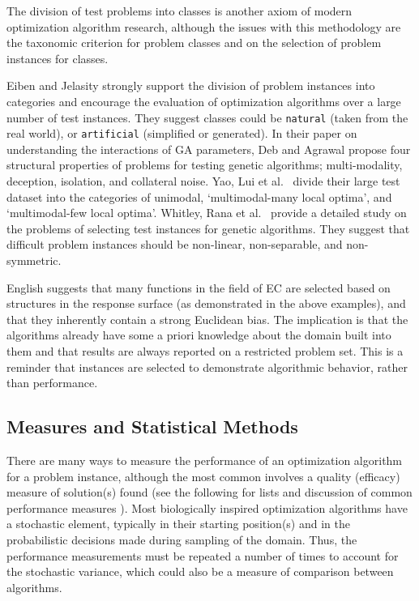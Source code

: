 The division of test problems into classes is another axiom of modern optimization algorithm research, although the issues with this methodology are the taxonomic criterion for problem classes and on the selection of problem instances for classes.

Eiben and Jelasity \cite{Eiben2002} strongly support the division of problem instances into categories and encourage the evaluation of optimization algorithms over a large number of test instances. They suggest classes could be \texttt{natural} (taken from the real world), or \texttt{artificial} (simplified or generated). In their paper on understanding the interactions of GA parameters, Deb and Agrawal \cite{Deb1999} propose four structural properties of problems for testing genetic algorithms; multi-modality, deception, isolation, and collateral noise. Yao, Lui et al.\ \cite{Yao1999} divide their large test dataset into the categories of unimodal,	`multimodal-many	local	optima',	and `multimodal-few local optima'. Whitley, Rana et al.\ \cite{Whitley1996} provide a detailed study on the problems of selecting test instances for genetic algorithms. They suggest that difficult problem instances should be non-linear, non-separable, and non-symmetric.

English \cite{English1996} suggests that many functions in the field of EC are selected based on structures in the response surface (as demonstrated in the above examples), and that they inherently contain a strong Euclidean bias. The implication is that the algorithms already have some a priori knowledge about the domain built into them and that results are always reported on a restricted problem set. This is a reminder that instances are selected to demonstrate algorithmic behavior, rather than performance.

% 
% 
\subsection{Measures and Statistical Methods}
There are many ways to measure the performance of an optimization algorithm for a problem instance, although the most common involves a quality (efficacy) measure of solution(s) found (see the following for lists and discussion of common performance measures \cite{Bartz-Beielstein2004, Birattari2005a, Hughes2006, Eiben2002, Barr1995}). Most biologically inspired optimization algorithms have a stochastic element, typically in their starting position(s) and in the probabilistic decisions made during sampling of the domain. Thus, the performance measurements must be repeated a number of times to account for the stochastic variance, which could also be a measure of comparison between algorithms.

